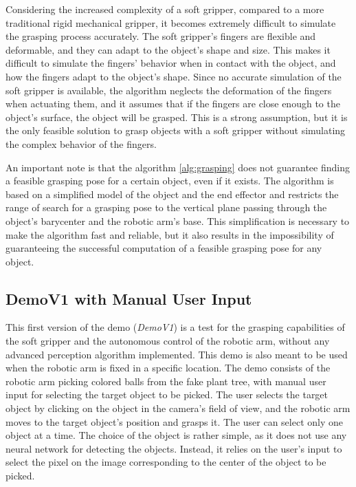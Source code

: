 Considering the increased complexity of a soft gripper, compared to a more traditional rigid mechanical gripper,
it becomes extremely difficult to simulate the grasping process accurately. The soft gripper's fingers are
flexible and deformable, and they can adapt to the object's shape and size. This makes it difficult to simulate
the fingers' behavior when in contact with the object, and how the fingers adapt to the object's shape.
Since no accurate simulation of the soft gripper is available, the algorithm neglects the deformation of the
fingers when actuating them, and it assumes that if the fingers are close enough to the object's surface,
the object will be grasped. This is a strong assumption, but it is the only feasible solution to grasp objects
with a soft gripper without simulating the complex behavior of the fingers.

An important note is that the algorithm \ref{alg:grasping} does not guarantee finding a feasible grasping
pose for a certain object, even if it exists. 
The algorithm is based on a simplified model of the object and the end effector and
restricts the range of search for a grasping pose to the vertical plane passing through the object's barycenter
and the robotic arm's base. This simplification is necessary to make the algorithm fast and reliable, but it
also results in the impossibility of guaranteeing the successful computation of a feasible grasping pose
for any object. 

\subsection{DemoV1 with Manual User Input}

This first version of the demo (\textit{DemoV1}) is a test for the grasping capabilities of the soft gripper and
the autonomous control of the robotic arm, without any advanced perception algorithm implemented. 
This demo is also meant to be used when the robotic arm is fixed in a specific location. The demo consists of
the robotic arm picking colored balls from the fake plant tree, with manual user input for selecting the target
object to be picked. The user selects the target object by clicking on the object in the camera's field of view,
and the robotic arm moves to the target object's position and grasps it. The user can select only one object at 
a time. The choice of the object is rather simple, as it does not use any neural network for detecting
the objects. Instead, it relies on the user's input to select the pixel on the image corresponding
to the center of the object to be picked.

